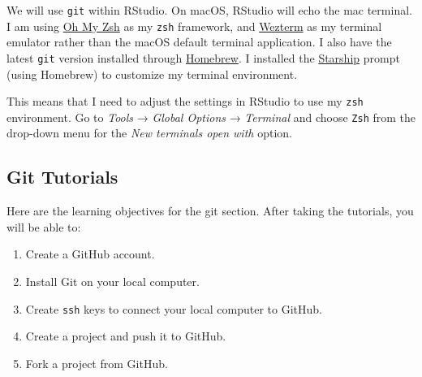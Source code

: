 \documentclass[
  letterpaper,
  DIV=11,
  numbers=noendperiod]{scrreprt}
\providecommand{\tightlist}{%
  \setlength{\itemsep}{0pt}\setlength{\parskip}{0pt}}\usepackage{longtable,booktabs,array}
\begin{document}
\begin{tcolorbox}[enhanced jigsaw, left=2mm, title=\textcolor{quarto-callout-tip-color}{\faLightbulb}\hspace{0.5em}{Tip}, opacityback=0, breakable, colbacktitle=quarto-callout-tip-color!10!white, colframe=quarto-callout-tip-color-frame, arc=.35mm, titlerule=0mm, leftrule=.75mm, opacitybacktitle=0.6, toptitle=1mm, colback=white, toprule=.15mm, bottomtitle=1mm, rightrule=.15mm, coltitle=black, bottomrule=.15mm]

We will use \texttt{git} within RStudio. On macOS, RStudio will echo the
mac terminal. I am using \href{https://ohmyz.sh/}{Oh My Zsh} as my
\texttt{zsh} framework, and
\href{https://wezfurlong.org/wezterm/index.html}{Wezterm} as my terminal
emulator rather than the macOS default terminal application. I also have
the latest \texttt{git} version installed through
\href{https://brew.sh/}{Homebrew}. I installed the
\href{https://starship.rs/}{Starship} prompt (using Homebrew) to
customize my terminal environment.

This means that I need to adjust the settings in RStudio to use my
\texttt{zsh} environment. Go to \emph{Tools} → \emph{Global Options} →
\emph{Terminal} and choose \texttt{Zsh} from the drop-down menu for the
\emph{New terminals open with} option.

\end{tcolorbox}

\subsection{Git Tutorials}\label{git-tutorials}

\begin{tcolorbox}[enhanced jigsaw, left=2mm, title=\textcolor{quarto-callout-important-color}{\faExclamation}\hspace{0.5em}{Important}, opacityback=0, breakable, colbacktitle=quarto-callout-important-color!10!white, colframe=quarto-callout-important-color-frame, arc=.35mm, titlerule=0mm, leftrule=.75mm, opacitybacktitle=0.6, toptitle=1mm, colback=white, toprule=.15mm, bottomtitle=1mm, rightrule=.15mm, coltitle=black, bottomrule=.15mm]

Here are the learning objectives for the git section. After taking the
tutorials, you will be able to:

\begin{enumerate}
\def\labelenumi{\arabic{enumi}.}
\tightlist
\item
  Create a GitHub account.
\item
  Install Git on your local computer.
\item
  Create \texttt{ssh} keys to connect your local computer to GitHub.
\item
  Create a project and push it to GitHub.
\item
  Fork a project from GitHub.
\end{enumerate}

\end{tcolorbox}
\end{document}

